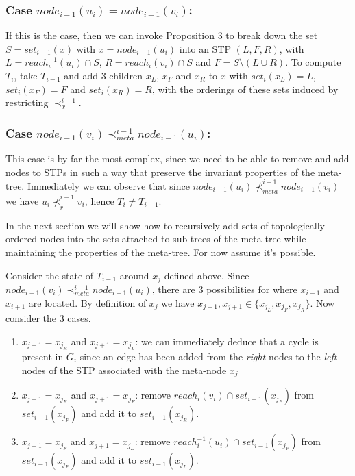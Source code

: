 \documentclass{article}
\begin{document}
\subsubsection{Case $node_{i-1}(u_{i}) = node_{i-1}(v_{i})$:}

If this is the case, then we can invoke Proposition 3 to break down the set $S=set_{i-1}(x)$ with $x=node_{i-1}(u_{i})$ into an STP $(L,F,R)$, with $L=reach_{i}^{-1}(u_{i}) \cap S$, $R=reach_{i}(v_{i}) \cap S$ and $F=S \setminus (L \cup R)$. To compute $T_{i}$, take $T_{i-1}$ and add 3 children $x_{L}$, $x_{F}$ and $x_{R}$ to $x$ with $set_{i}(x_{L}) = L$, $set_{i}(x_{F}) = F$ and $set_{i}(x_{R}) = R$, with the orderings of these sets induced by restricting $\prec_{x}^{i-1}$.

\subsubsection{Case $node_{i-1}(v_{i}) \prec_{meta}^{i-1} node_{i-1}(u_{i})$:}

This case is by far the most complex, since we need to be able to remove and add nodes to STPs in such a way that preserve the invariant properties of the meta-tree. Immediately we can observe that since $node_{i-1}(u_{i}) \nprec_{meta}^{i-1} node_{i-1}(v_{i})$ we have $u_{i} \nprec_{r}^{i-1} v_{i}$, hence $T_{i} \neq T_{i-1}$.

In the next section we will show how to recursively add sets of topologically ordered nodes into the sets attached to sub-trees of the meta-tree while maintaining the properties of the meta-tree. For now assume it's possible.

Consider the state of $T_{i-1}$ around $x_{j}$ defined above. Since $node_{i-1}(v_{i}) \prec_{meta}^{i-1} node_{i-1}(u_{i})$, there are 3 possibilities for where $x_{i-1}$ and $x_{i+1}$ are located. By definition of $x_{j}$ we have $x_{j-1}, x_{j+1} \in \{ x_{j_{L}}, x_{j_{F}}, x_{j_{R}} \}$. Now consider the 3 cases.

\begin{enumerate}
    \item $x_{j-1}=x_{j_{R}}$ and $x_{j+1}=x_{j_{L}}$: we can immediately deduce that a cycle is present in $G_{i}$ since an edge has been added from the \textit{right} nodes to the \textit{left} nodes of the STP associated with the meta-node $x_{j}$
    
    \item $x_{j-1}=x_{j_{R}}$ and $x_{j+1}=x_{j_{F}}$: remove $reach_{i}(v_{i}) \cap set_{i-1}(x_{j_{F}})$ from $set_{i-1}(x_{j_{F}})$ and add it to $set_{i-1}(x_{j_{R}})$.
    
    \item $x_{j-1}=x_{j_{F}}$ and $x_{j+1}=x_{j_{L}}$: remove $reach_{i}^{-1}(u_{i}) \cap set_{i-1}(x_{j_{F}})$ from $set_{i-1}(x_{j_{F}})$ and add it to $set_{i-1}(x_{j_{L}})$.
\end{enumerate}
\end{document}
